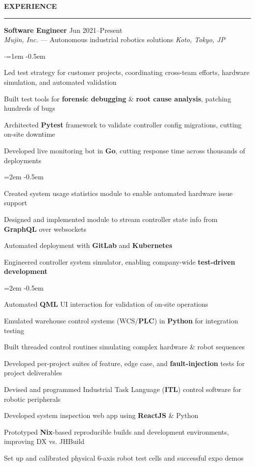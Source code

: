 \documentclass[10pt, a4paper]{article}
\newenvironment{aSection}[1]{
    \medskip \textbf{\uppercase{#1}}
    \smallskip
    \hrule
    \begin{list}{}{
            \setlength{\leftmargin}{1.5em}
        }
    \item[]
    }{
    \end{list}
}
\newenvironment{expSubsection}[4]{
    \textbf{#3} \hfill {#2} \\
    {#1} \hfill \textit{#4}
    \smallskip
    \begin{list}{$\cdot$}{\leftmargin=1em}
    \itemsep -0.5em \vspace{-0.5em}
    }{
    \end{list}
    \vspace{0.5em}
}
\newenvironment{subList}{
    \begin{list}{\raisebox{.4ex}{\tiny$\succ$}}{\leftmargin=2em}
    \itemsep -0.5em \vspace{-0.5em}
    }{
    \end{list}
}
\begin{document}
\begin{aSection}{Experience}
    \begin{expSubsection}
        {\textit{Mujin, Inc.} --- Autonomous industrial robotics solutions}
        {Jun 2021--Present}
        {Software Engineer}
        {Koto, Tokyo, JP}
    \item Led test strategy for customer projects, coordinating cross-team efforts, hardware simulation, and automated
        validation
    \item Built test tools for \textbf{forensic debugging} \& \textbf{root cause analysis}, patching hundreds of bugs
    \item Architected \textbf{Pytest} framework to validate controller config migrations, cutting on-site downtime
    \item Developed live monitoring bot in \textbf{Go}, cutting response time across thousands of deployments
        \begin{subList}
        \item Created system usage statistics module to enable automated hardware issue support
        \item Designed and implemented module to stream controller state info from \textbf{GraphQL} over websockets
        \item Automated deployment with \textbf{GitLab} and \textbf{Kubernetes}
        \end{subList}
    \item Engineered controller system simulator, enabling company-wide \textbf{test-driven development}
        \begin{subList}
        \item Automated \textbf{QML} UI interaction for validation of on-site operations
        \item Emulated warehouse control systems (WCS/\textbf{PLC}) in \textbf{Python} for integration testing
        \item Built threaded control routines simulating complex hardware \& robot sequences
        \item Developed per-project suites of feature, edge case, and \textbf{fault-injection} tests for project
            deliverables
        \end{subList}
    \item Devised and programmed Industrial Task Language (\textbf{ITL}) control software for robotic peripherals
    \item Developed system inspection web app using \textbf{ReactJS} \& Python
    \item Prototyped \textbf{Nix}-based reproducible builds and development environments, improving DX vs. JHBuild
    \item Set up and calibrated physical 6-axis robot test cells and successful expo demos
    \end{expSubsection}


\end{aSection}
\end{document}
